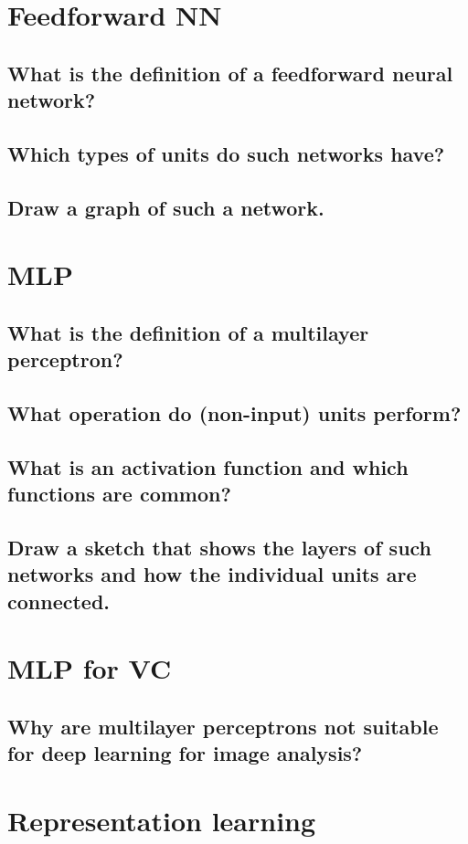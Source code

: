 \section{Feedforward NN}
\subsection{What is the definition of a feedforward neural network?}
\subsection{Which types of units do such networks have?}
\subsection{Draw a graph of such a network.}

\section{MLP}
\subsection{What is the definition of a multilayer perceptron?}
\subsection{What operation do (non-input) units perform?}
\subsection{What is an activation function and which functions are common?}
\subsection{Draw a sketch that shows the layers of such networks and how the individual units are connected.}

\section{MLP for VC}
\subsection{Why are multilayer perceptrons not suitable for deep learning for image analysis?}

\section{Representation learning}
